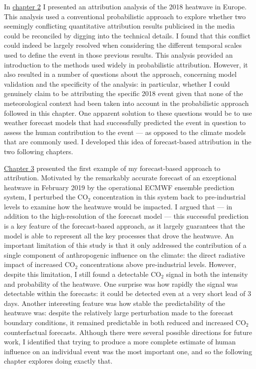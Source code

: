   In \hyperref[ch2]{chapter 2} I presented an attribution analysis of the 2018 heatwave in Europe. This analysis used a conventional probabilistic approach to explore whether two seemingly conflicting quantitative attribution results publicised in the media could be reconciled by digging into the technical details. I found that this conflict could indeed be largely resolved when considering the different temporal scales used to define the event in those previous results. This analysis provided an introduction to the methods used widely in probabilistic attribution. However, it also resulted in a number of questions about the approach, concerning model validation and the specificity of the analysis: in particular, whether I could genuinely claim to be attributing the specific 2018 event given that none of the meteorological context had been taken into account in the probabilistic approach followed in this chapter. One apparent solution to these questions would be to use weather forecast models that had successfully predicted the event in question to assess the human contribution to the event --- as opposed to the climate models that are commonly used. I developed this idea of forecast-based attribution in the two following chapters.

  \hyperref[ch3]{Chapter 3} presented the first example of my forecast-based approach to attribution. Motivated by the remarkably accurate forecast of an exceptional heatwave in February 2019 by the operational ECMWF ensemble prediction system, I perturbed the CO$_2$ concentration in this system back to pre-industrial levels to examine how the heatwave would be impacted. I argued that --- in addition to the high-resolution of the forecast model --- this successful prediction is a key feature of the forecast-based approach, as it largely guarantees that the model is able to represent all the key processes that drove the heatwave. An important limitation of this study is that it only addressed the contribution of a single component of anthropogenic influence on the climate: the direct radiative impact of increased CO$_2$ concentrations above pre-industrial levels. However, despite this limitation, I still found a detectable CO$_2$ signal in both the intensity and probability of the heatwave. One surprise was how rapidly the signal was detectable within the forecasts: it could be detected even at a very short lead of 3 days. Another interesting feature was how stable the predictability of the heatwave was: despite the relatively large perturbation made to the forecast boundary conditions, it remained predictable in both reduced and increased CO$_2$ counterfactual forecasts. Although there were several possible directions for future work, I identified that trying to produce a more complete estimate of human influence on an individual event was the most important one, and so the following chapter explores doing exactly that.

